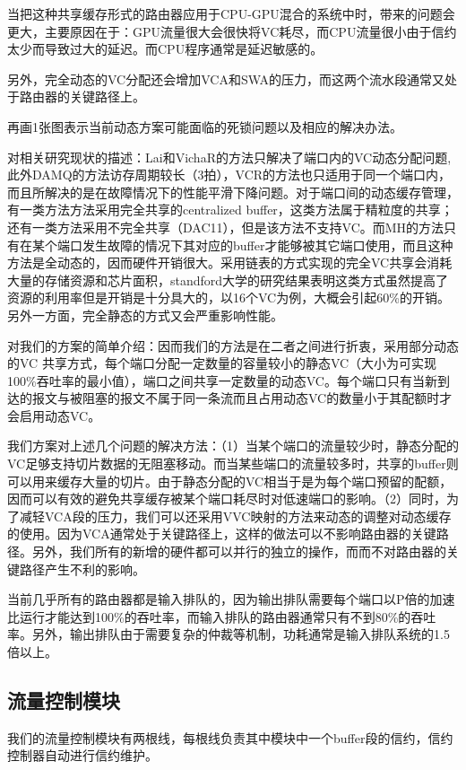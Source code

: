 \documentclass[10pt,journal]{IEEEtran}
\begin{document}
当把这种共享缓存形式的路由器应用于CPU-GPU混合的系统中时，带来的问题会更大，主要原因在于：GPU流量很大会很快将VC耗尽，而CPU流量很小由于信约太少而导致过大的延迟。而CPU程序通常是延迟敏感的。

另外，完全动态的VC分配还会增加VCA和SWA的压力，而这两个流水段通常又处于路由器的关键路径上。

再画1张图表示当前动态方案可能面临的死锁问题以及相应的解决办法。

对相关研究现状的描述：Lai和VichaR的方法只解决了端口内的VC动态分配问题,此外DAMQ的方法访存周期较长（3拍），VCR的方法也只适用于同一个端口内，而且所解决的是在故障情况下的性能平滑下降问题。对于端口间的动态缓存管理，有一类方法方法采用完全共享的centralized buffer，这类方法属于精粒度的共享；还有一类方法采用不完全共享（DAC11），但是该方法不支持VC。而MH的方法只有在某个端口发生故障的情况下其对应的buffer才能够被其它端口使用，而且这种方法是全动态的，因而硬件开销很大。采用链表的方式实现的完全VC共享会消耗大量的存储资源和芯片面积，standford大学的研究结果表明这类方式虽然提高了资源的利用率但是开销是十分具大的，以16个VC为例，大概会引起60\%的开销。另外一方面，完全静态的方式又会严重影响性能。

对我们的方案的简单介绍：因而我们的方法是在二者之间进行折衷，采用部分动态的VC 共享方式，每个端口分配一定数量的容量较小的静态VC（大小为可实现100\%吞吐率的最小值），端口之间共享一定数量的动态VC。每个端口只有当新到达的报文与被阻塞的报文不属于同一条流而且占用动态VC的数量小于其配额时才会启用动态VC。

我们方案对上述几个问题的解决方法：（1）当某个端口的流量较少时，静态分配的VC足够支持切片数据的无阻塞移动。而当某些端口的流量较多时，共享的buffer则可以用来缓存大量的切片。由于静态分配的VC相当于是为每个端口预留的配额，因而可以有效的避免共享缓存被某个端口耗尽时对低速端口的影响。（2）同时，为了减轻VCA段的压力，我们可以还采用VVC映射的方法来动态的调整对动态缓存的使用。因为VCA通常处于关键路径上，这样的做法可以不影响路由器的关键路径。另外，我们所有的新增的硬件都可以并行的独立的操作，而而不对路由器的关键路径产生不利的影响。

当前几乎所有的路由器都是输入排队的，因为输出排队需要每个端口以P倍的加速比运行才能达到100\%的吞吐率，而输入排队的路由器通常只有不到80\%的吞吐率。另外，输出排队由于需要复杂的仲裁等机制，功耗通常是输入排队系统的1.5倍以上。

\subsection{流量控制模块}
我们的流量控制模块有两根线，每根线负责其中模块中一个buffer段的信约，信约控制器自动进行信约维护。
\end{document}
